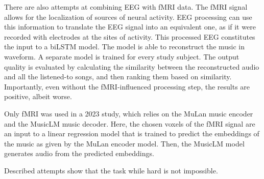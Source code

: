 There are also attempts at combining EEG with fMRI data\cite{daly}.
The fMRI signal allows for the localization of sources of neural activity.
EEG processing can use this information to translate the EEG signal into an equivalent one, as if it were recorded with electrodes at the sites of activity.
This processed EEG constitutes the input to a biLSTM model. The model is able to reconstruct the music in waveform. A separate model is trained for every study subject.
The output quality is evaluated by calculating the similarity between the reconstructed audio and all the listened-to songs, and then ranking them based on similarity.
Importantly, even without the fMRI-influenced processing step, the results are positive, albeit worse.

Only fMRI was used in a 2023 study\cite{denk}, which relies on the MuLan music encoder and the MusicLM music decoder.
Here, the chosen voxels of the fMRI signal are an input to a linear regression model that is trained to predict the embeddings of the music as given by the MuLan encoder model.
Then, the MusicLM model generates audio from the predicted embeddings.

Described attempts show that the task while hard is not impossible.




